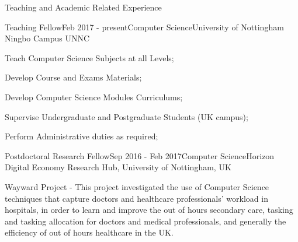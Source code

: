 \documentclass{resume} %
\begin{document}
\begin{rSection}{Teaching and Academic Related Experience}
	\begin{rSubsection}{Teaching Fellow}{Feb 2017 - present}{Computer Science}{University of Nottingham Ningbo Campus UNNC}
			\item Teach Computer Science Subjects at all Levels;
			\item Develop Course and  Exams Materials;
			\item Develop Computer Science Modules Curriculums;
			\item Supervise Undergraduate and Postgraduate Students (UK campus);
			\item Perform Administrative duties as required;
	\end{rSubsection}
	
	\begin{rSubsection}{Postdoctoral Research Fellow}{Sep 2016 - Feb 2017}{Computer Science}{Horizon Digital Economy Research Hub, University of Nottingham, UK}
		\item Wayward Project -  This project investigated the use of Computer Science techniques that capture doctors and healthcare professionals' workload in hospitals, in order to learn and improve the out of hours secondary care, tasking and tasking allocation for doctors and medical professionals, and generally the efficiency of out of hours healthcare in the UK.
	\end{rSubsection}	
	

\end{rSection}
\end{document}

